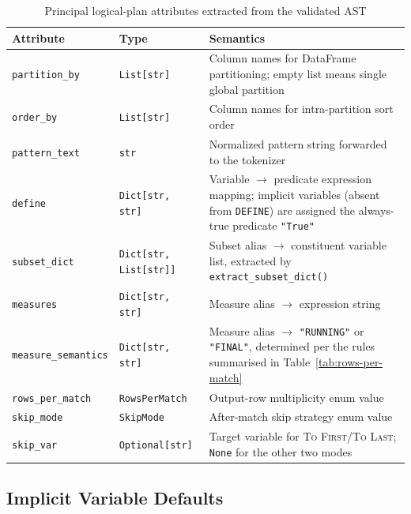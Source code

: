 \begin{table}[htbp]
  \centering
  \caption{Principal logical-plan attributes extracted from the
    validated AST}
  \label{tab:logical-plan}
  \begin{tabular}{llp{6.5cm}}
    \toprule
    \textbf{Attribute} & \textbf{Type} & \textbf{Semantics} \\
    \midrule
    \texttt{partition\_by}   & \texttt{List[str]}
      & Column names for DataFrame partitioning; empty list means
        single global partition \\[4pt]
    \texttt{order\_by}       & \texttt{List[str]}
      & Column names for intra-partition sort order \\[4pt]
    \texttt{pattern\_text}   & \texttt{str}
      & Normalized pattern string forwarded to the tokenizer \\[4pt]
    \texttt{define}          & \texttt{Dict[str, str]}
      & Variable $\to$ predicate expression mapping; implicit
        variables (absent from \texttt{DEFINE}) are assigned
        the always-true predicate \texttt{"True"} \\[4pt]
    \texttt{subset\_dict}    & \texttt{Dict[str, List[str]]}
      & Subset alias $\to$ constituent variable list, extracted
        by \texttt{extract\_subset\_dict()} \\[4pt]
    \texttt{measures}        & \texttt{Dict[str, str]}
      & Measure alias $\to$ expression string \\[4pt]
    \texttt{measure\_semantics} & \texttt{Dict[str, str]}
      & Measure alias $\to$ \texttt{"RUNNING"} or
        \texttt{"FINAL"}, determined per the rules summarised in
        Table~\ref{tab:rows-per-match} \\[4pt]
    \texttt{rows\_per\_match} & \texttt{RowsPerMatch}
      & Output-row multiplicity enum value \\[4pt]
    \texttt{skip\_mode}      & \texttt{SkipMode}
      & After-match skip strategy enum value \\[4pt]
    \texttt{skip\_var}       & \texttt{Optional[str]}
      & Target variable for \textsc{To First}/\textsc{To Last};
        \texttt{None} for the other two modes \\
    \bottomrule
  \end{tabular}
\end{table}

\subsection{Implicit Variable Defaults}
\label{subsec:logical-implicit}

